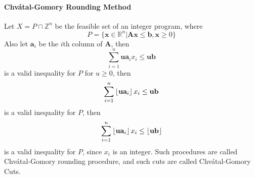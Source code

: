             \paragraph{Chv\'atal-Gomory Rounding Method}
                Let $X = P \cap \mathbb{Z}^n$ be the feasible set of an integer program, where
                \begin{equation*}
                    P = \{\mathbf{x} \in \mathbb{R}^n | \mathbf{Ax}\le \mathbf{b}, \mathbf{x} \ge 0\}
                \end{equation*}
                Also let $\mathbf{a}_i$ be the $i$th column of $\mathbf{A}$, then
                \begin{equation*}
                    \sum_{i = 1}^n \mathbf{u} \mathbf{a}_i x_i \le \mathbf{ub}
                \end{equation*}
                is a valid inequality for $P$ for $u \ge 0$, then
                \begin{equation*}
                    \sum_{i = 1}^n \left\lfloor \mathbf{u} \mathbf{a}_i \right\rfloor x_i \le \mathbf{ub}
                \end{equation*}
                is a valid inequality for $P$, then
                \begin{equation*}
                    \sum_{i = 1}^n \left\lfloor \mathbf{u} \mathbf{a}_i \right\rfloor x_i \le \left\lfloor \mathbf{ub} \right\rfloor
                \end{equation*}
                is a valid inequality for $P$, since $x_i$ is an integer. Such procedures are called Chv\'atal-Gomory rounding procedure, and such cuts are called Chv\'atal-Gomory Cuts.

